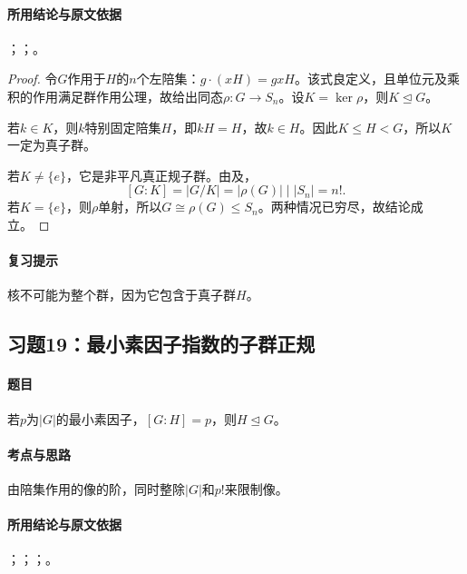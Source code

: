 \paragraph{所用结论与原文依据}
；；。


\begin{proof}
令$G$作用于$H$的$n$个左陪集：$g\cdot(xH)=gxH$。该式良定义，且单位元及乘积的作用满足群作用公理，故给出同态$\rho:G\to S_n$。设$K=\ker\rho$，则$K\trianglelefteq G$。

若$k\in K$，则$k$特别固定陪集$H$，即$kH=H$，故$k\in H$。因此$K\leq H<G$，所以$K$一定为真子群。

若$K\ne\{e\}$，它是非平凡真正规子群。由及，
\[
[G:K]=|G/K|=|\rho(G)|\mid|S_n|=n!.
\]
若$K=\{e\}$，则$\rho$单射，所以$G\cong\rho(G)\leq S_n$。两种情况已穷尽，故结论成立。
\end{proof}

\paragraph{复习提示}
核不可能为整个群，因为它包含于真子群$H$。


\subsection{习题19：\texorpdfstring{最小素因子指数的子群正规}{最小素因子指数的子群正规}}
\label{ex:2:19}

\paragraph{题目}
若$p$为$|G|$的最小素因子，$[G:H]=p$，则$H\trianglelefteq G$。

\paragraph{考点与思路}
由陪集作用的像的阶，同时整除$|G|$和$p!$来限制像。

\paragraph{所用结论与原文依据}
；；；。


